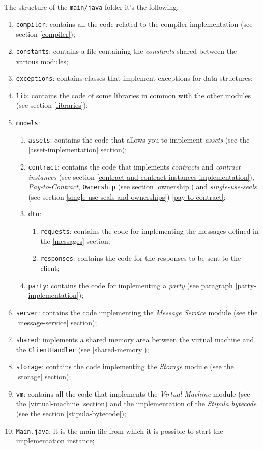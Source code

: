 The structure of the \verb|main/java| folder it's the following:
\begin{enumerate}
   \item \verb|compiler|: contains all the code related to the compiler implementation (see section 
   \ref{compiler});
   \item \verb|constants|: contains a file containing the \textit{constants} shared between the various modules;
   \item \verb|exceptions|: contains classes that implement exceptions for data structures;
   \item \verb|lib|: contains the code of some libraries in common with the other modules (see section 
   \ref{libraries});
   \newpage
   \item \verb|models|:
     \begin{enumerate}
       \item \verb|assets|: contains the code that allows you to implement \textit{assets} (see the 
       \ref{asset-implementation} section);
       \item \verb|contract|: contains the code that implements \textit{contracts} and 
       \textit{contract instances} (see section \ref{contract-and-contract-instances-implementation}), \textit {Pay-to-Contract}, \verb|Ownership| (see section \ref{ownership}) and 
       \textit{single-use-seals} (see section \ref{single-use-seals-and-ownerships}) 
       \ref{pay-to-contract};
       \item \verb|dto|:
         \begin{enumerate}
           \item \verb|requests|: contains the code for implementing the messages defined in the 
           \ref{messages} section;
           \item \verb|responses|: contains the code for the responses to be sent to the client;
         \end{enumerate}
       \item \verb|party|: contains the code for implementing a \textit{party} (see paragraph 
       \ref{party-implementation});
     \end{enumerate}
   \item \verb|server|: contains the code implementing the \textit{Message Service} module (see the \ref{message-service} section);
   \item \verb|shared|: implements a shared memory area between the virtual machine and the \verb|ClientHandler| (see \ref{shared-memory});
   \item \verb|storage|: contains the code implementing the \textit{Storage} module (see the \ref{storage} section);
   \item \verb|vm|: contains all the code that implements the \textit{Virtual Machine} module (see the 
   \ref{virtual-machine} section) and the implementation of the \textit{Stipula bytecode} (see the section \ref{stipula-bytecode});
   \item \verb|Main.java|: it is the main file from which it is possible to start the implementation instance;
\end{enumerate}
